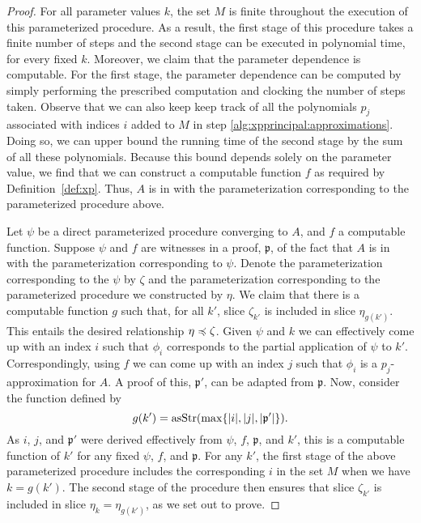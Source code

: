 \begin{proof}
  For all parameter values $k$, the set $M$ is finite throughout the execution of this parameterized procedure.
  As a result, the first stage of this procedure takes a finite number of steps and the second stage can be executed in polynomial time, for every fixed $k$.
  Moreover, we claim that the parameter dependence is computable.
  For the first stage, the parameter dependence can be computed by simply performing the prescribed computation and clocking the number of steps taken.
  Observe that we can also keep keep track of all the polynomials $p_j$ associated with indices $i$ added to $M$ in step \ref{alg:xpprincipal:approximations}.
  Doing so, we can upper bound the running time of the second stage by the sum of all these polynomials.
  Because this bound depends solely on the parameter value, we find that we can construct a computable function $f$ as required by Definition~\ref{def:xp}.
  Thus, $A$ is in  with the parameterization corresponding to the parameterized procedure above.

  Let $\psi$ be a direct parameterized procedure converging to $A$, and $f$ a computable function.
  Suppose $\psi$ and $f$ are witnesses in a proof, $\mathfrak{p}$, of the fact that $A$ is in  with the parameterization corresponding to $\psi$.
  Denote the parameterization corresponding to the $\psi$ by $\zeta$ and the parameterization corresponding to the parameterized procedure we constructed by $\eta$.
  We claim that there is a computable function $g$ such that, for all $k'$, slice $\zeta_{k'}$ is included in slice $\eta_{g(k')}$.
  This entails the desired relationship $\eta \preccurlyeq \zeta$.
  Given $\psi$ and $k$ we can effectively come up with an index $i$ such that $\phi_i$ corresponds to the partial application of $\psi$ to $k'$.
  Correspondingly, using $f$ we can come up with an index $j$ such that $\phi_i$ is a $p_j$-approximation for $A$.
  A proof of this, $\mathfrak{p}'$, can be adapted from $\mathfrak{p}$.
  Now, consider the function defined by
  \begin{equation*}
    g(k') = \operatorname{asStr}(\max\{{\lvert i\rvert}, {\lvert j\rvert}, {\lvert\mathfrak{p}'\rvert}\}).
  \end{equation*}
  As $i$, $j$, and $\mathfrak{p}'$ were derived effectively from $\psi$, $f$, $\mathfrak{p}$, and $k'$, this is a computable function of $k'$ for any fixed $\psi$, $f$, and $\mathfrak{p}$.
  For any $k'$, the first stage of the above parameterized procedure includes the corresponding $i$ in the set $M$ when we have $k = g(k')$.
  The second stage of the procedure then ensures that slice $\zeta_{k'}$ is included in slice $\eta_k = \eta_{g(k')}$, as we set out to prove.
\end{proof}

